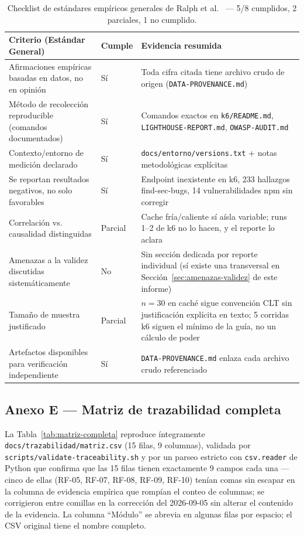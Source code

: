 \begin{table}[H]
\centering
\small
\begin{tabular}{p{7.5cm}p{1.3cm}p{5cm}}
\toprule
\textbf{Criterio (Estándar General)} & \textbf{Cumple} & \textbf{Evidencia resumida} \\
\midrule
Afirmaciones empíricas basadas en datos, no en opinión & Sí & Toda cifra citada tiene archivo crudo de origen (\texttt{DATA-PROVENANCE.md}) \\
Método de recolección reproducible (comandos documentados) & Sí & Comandos exactos en \texttt{k6/README.md}, \texttt{LIGHTHOUSE-REPORT.md}, \texttt{OWASP-AUDIT.md} \\
Contexto/entorno de medición declarado & Sí & \texttt{docs/entorno/versions.txt} + notas metodológicas explícitas \\
Se reportan resultados negativos, no solo favorables & Sí & Endpoint inexistente en k6, 233 hallazgos find-sec-bugs, 14 vulnerabilidades npm sin corregir \\
Correlación vs. causalidad distinguidas & Parcial & Cache fría/caliente sí aísla variable; runs 1--2 de k6 no lo hacen, y el reporte lo aclara \\
Amenazas a la validez discutidas sistemáticamente & No & Sin sección dedicada por reporte individual (sí existe una transversal en Sección~\ref{sec:amenazas-validez} de este informe) \\
Tamaño de muestra justificado & Parcial & $n=30$ en caché sigue convención CLT sin justificación explícita en texto; 5 corridas k6 siguen el mínimo de la guía, no un cálculo de poder \\
Artefactos disponibles para verificación independiente & Sí & \texttt{DATA-PROVENANCE.md} enlaza cada archivo crudo referenciado \\
\bottomrule
\end{tabular}
\caption{Checklist de estándares empíricos generales de Ralph et al.~\cite{ralph2021} --- 5/8 cumplidos, 2 parciales, 1 no cumplido.}
\label{tab:ralph-general}
\end{table}

\subsection{Anexo E --- Matriz de trazabilidad completa}
\label{anexo:matriz}

La Tabla~\ref{tab:matriz-completa} reproduce íntegramente \texttt{docs/trazabilidad/matriz.csv} (15
filas, 9 columnas), validada por \texttt{scripts/validate-traceability.sh} y por un parseo estricto con
\texttt{csv.reader} de Python que confirma que las 15 filas tienen exactamente 9 campos cada una ---
cinco de ellas (RF-05, RF-07, RF-08, RF-09, RF-10) tenían comas sin escapar en la columna de evidencia
empírica que rompían el conteo de columnas; se corrigieron entre comillas en la corrección del 2026-09-05
sin alterar el contenido de la evidencia. La columna ``Módulo'' se abrevia en algunas filas por espacio;
el CSV original tiene el nombre completo.


